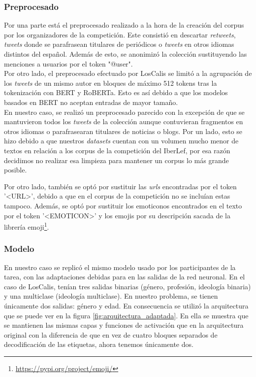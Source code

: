 \subsubsection{Preprocesado}

Por una parte está el preprocesado realizado a la hora de la creación del corpus por los organizadores de la competición. Este consistió en descartar \textit{retweets}, \textit{tweets} donde se parafrasean titulares de periódicos o \textit{tweets} en otros idiomas distintos del español. Además de esto, se anonimizó la colección sustituyendo las menciones a usuarios por el token "@user".\\
Por otro lado, el preprocesado efectuado por LosCalis se limitó a la agrupación de los \textit{tweets} de un mismo autor en bloques de máximo 512 tokens tras la tokenización con BERT y RoBERTa. Esto es así debido a que los modelos basados en BERT no aceptan entradas de mayor tamaño.\\
En nuestro caso, se realizó un preprocesado parecido con la excepción de que se mantuvieron todos los \textit{tweets} de la colección aunque contuvieran fragmentos en otros idiomas o parafrasearan titulares de noticias o blogs. Por un lado, esto se hizo debido a que nuestros \textit{datasets} cuentan con un volumen mucho menor de textos en relación a los corpus de la competición del IberLef, por esa razón decidimos no realizar esa limpieza para mantener un corpus lo más grande posible.

Por otro lado, también se optó por sustituir las \textit{urls} encontradas por el token '<URL>', debido a que en el corpus de la competición no se incluían estas tampoco. Además, se optó por sustituir los emoticonos encontrados en el texto por el token '<EMOTICON>' y los emojis por su descripción sacada de la librería emoji\footnote{\url{https://pypi.org/project/emoji/}}.

\subsubsection{Modelo}
En nuestro caso se replicó el mismo modelo usado por los participantes de la tarea, con las adaptaciones debidas para en las salidas de la red neuronal. En el caso de LosCalis, tenían tres salidas binarias (género, profesión, ideología binaria) y una multiclase (ideología multiclase). En nuestro problema, se tienen únicamente dos salidas: género y edad. En consecuencia se utilizó la arquitectura que se puede ver en la figura \ref{fig:arquitectura_adaptada}. En ella se muestra que se mantienen las mismas capas y funciones de activación que en la arquitectura original con la diferencia de que en vez de cuatro bloques separados de decodificación de las etiquetas, ahora tenemos únicamente dos.


